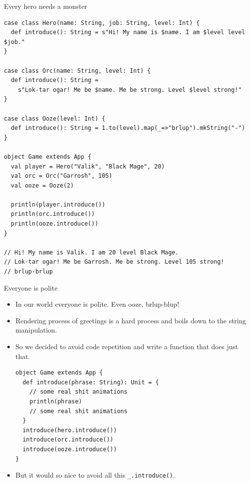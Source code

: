 \documentclass[presentation,aspectratio=169,smaller]{beamer}
\begin{document}
\begin{frame}[label={sec:org8936489},fragile]{Every hero needs a monster}
 \begin{verbatim}
case class Hero(name: String, job: String, level: Int) {
  def introduce(): String = s"Hi! My name is $name. I am $level level $job."
}

case class Orc(name: String, level: Int) {
  def introduce(): String =
    s"Lok-tar ogar! Me be $name. Me be strong. Level $level strong!"
}

case class Ooze(level: Int) {
  def introduce(): String = 1.to(level).map(_=>"brlup").mkString("-")
}

object Game extends App {
  val player = Hero("Valik", "Black Mage", 20)
  val orc = Orc("Garrosh", 105)
  val ooze = Ooze(2)

  println(player.introduce())
  println(orc.introduce())
  println(ooze.introduce())
}

// Hi! My name is Valik. I am 20 level Black Mage.
// Lok-tar ogar! Me be Garrosh. Me be strong. Level 105 strong!
// brlup-brlup
\end{verbatim}
\end{frame}

\begin{frame}[label={sec:org8fe115c},fragile]{Everyone is polite}
 \begin{itemize}
\item In our world everyone is polite. Even ooze, brlup-blup!
\item Rendering process of greetings is a hard process and boils down to the string
manipulation.
\item So we decided to avoid code repetition and write a function that does just that.

\begin{verbatim}
object Game extends App {
  def introduce(phrase: String): Unit = {
    // some real shit animations
    println(phrase)
    // some real shit animations
  }
  introduce(hero.introduce())
  introduce(orc.introduce())
  introduce(ooze.introduce())
}
\end{verbatim}

\item But it would so nice to avoid all this \texttt{\_.introduce()}.
\end{itemize}
\end{frame}
\end{document}

